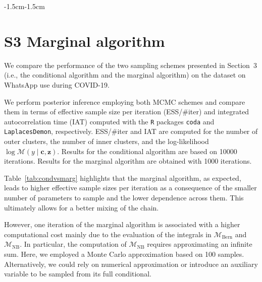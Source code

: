 \documentclass[11pt]{article}
\begin{document}
\begin{changemargin}{-1.5cm}{-1.5cm}
\section*{ S3 Marginal algorithm} \label{ap:marg}
We compare the performance of the two sampling schemes presented in Section~3 %
(i.e., the conditional algorithm and the marginal algorithm) on the dataset on WhatsApp use during COVID-19. 

We perform posterior inference employing both MCMC schemes  and  compare them in terms of effective sample size per iteration (ESS/\#iter) and integrated autocorrelation time (IAT) computed with the \texttt{R} packages \texttt{coda} and \texttt{LaplacesDemon}, respectively. ESS/\#iter and IAT are computed for the number of outer clusters, the number of inner clusters, and the log-likelihood $\log \mathcal{M}(y\mid \bm{c}, \bm{z})$. Results for the conditional algorithm are based on 10000 iterations. Results for the marginal algorithm are obtained with 1000 iterations.

Table~\ref{tab:condvsmarg} highlights that the marginal algorithm, as expected, leads to higher effective sample sizes per iteration as a consequence of the smaller number of parameters to sample and the lower dependence across them. This  ultimately allows for a better mixing of the chain. 


\begin{table}[h] 
	\caption{\label{tab:condvsmarg} Comparison between conditional and marginal algorithm.}
\end{table}


However,  one iteration of the marginal algorithm is associated with a higher computational cost mainly due to the evaluation of the integrals in $\mathcal{M}_{\text{Bern}}$ and $\mathcal{M}_{\text{NB}}$. In particular, the computation of $\mathcal{M}_{\text{NB}}$ requires approximating an infinite sum. Here, we employed a Monte Carlo approximation based on 100 samples. Alternatively,  we could rely on numerical approximation or introduce an auxiliary variable to be sampled from its full conditional.


\end{changemargin}
\end{document}
